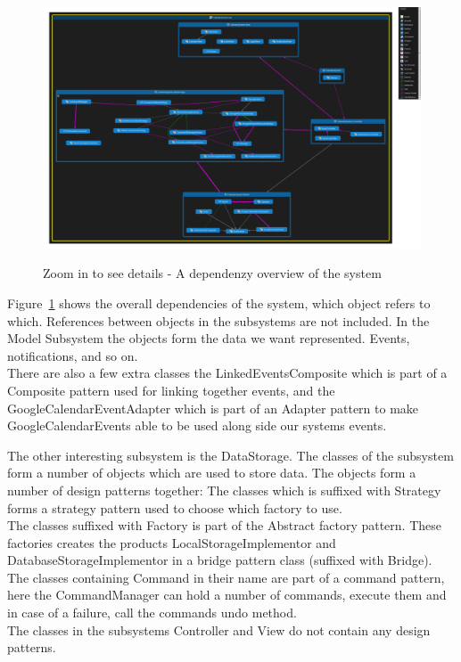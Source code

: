 \begin{figure}[h!]
	\centering
		\includegraphics[scale=0.13]{OverallClassDependencies}\\
	\caption{Zoom in to see details - A dependenzy overview of the system}
  \label{fig:OverallClassDependencies}
\end{figure}
Figure~\ref{fig:OverallClassDependencies} shows the overall dependencies of the system, which object refers to which. References between objects in the subsystems are not included. In the Model Subsystem the objects form the data we want represented. Events, notifications, and so on. \\There are also a few extra classes the LinkedEventsComposite which is part of a Composite pattern used for linking together events, and the GoogleCalendarEventAdapter which is part of an Adapter pattern to make GoogleCalendarEvents able to be used along side our systems events.

The other interesting subsystem is the DataStorage. The classes of the subsystem form a number of objects which are used to store data. The objects form a number of design patterns together: The classes which is suffixed with Strategy forms a strategy pattern used to choose which factory to use. \\The classes suffixed with Factory is part of the Abstract factory pattern. These factories creates the products LocalStorageImplementor and DatabaseStorageImplementor in a bridge pattern class (suffixed with Bridge). \\The classes containing Command in their name are part of a command pattern, here the CommandManager can hold a number of commands, execute them and in case of a failure, call the commands undo method.\\

The classes in the subsystems Controller and View do not contain any design patterns.